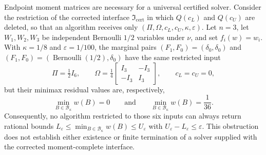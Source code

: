 Endpoint moment matrices are necessary for a universal certified solver.  Consider the restriction of the corrected interface \(\mathfrak I_{\mathrm{cert}}\) in which \(Q(c_L)\) and \(Q(c_U)\) are deleted, so that an algorithm receives only \((\Pi,\Omega,c_L,c_U,\kappa,\varepsilon)\).  Let \(n=3\), let \(W_1,W_2,W_3\) be independent Bernoulli \(1/2\) variables under \(\nu\), and set \(f_i(w)=w_i\).  With \(\kappa=1/8\) and \(\varepsilon=1/100\), the marginal pairs \((F_1,F_0)=(\delta_0,\delta_0)\) and \((F_1,F_0)=(\operatorname{Bernoulli}(1/2),\delta_0)\) have the same restricted input
\[
\Pi=\tfrac12 I_6,\qquad
\Omega=\tfrac14\begin{bmatrix}I_3&-I_3\\-I_3&I_3\end{bmatrix},
\qquad c_L=c_U=0,
\]
but their minimax residual values are, respectively,
\[
\min_{B\in\mathcal B_\kappa}w(B)=0
\qquad\text{and}\qquad
\min_{B\in\mathcal B_\kappa}w(B)=\frac1{36}.
\]
Consequently, no algorithm restricted to those six inputs can always return rational bounds \(L_{\varepsilon}\le\min_{B\in\mathcal B_\kappa}w(B)\le U_{\varepsilon}\) with \(U_{\varepsilon}-L_{\varepsilon}\le\varepsilon\).  This obstruction does not establish either existence or finite termination of a solver supplied with the corrected moment-complete interface.